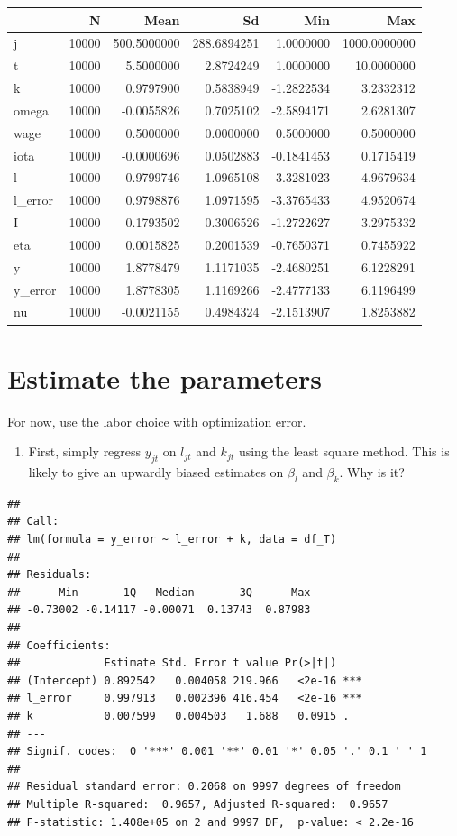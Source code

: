 \documentclass[
]{book}
\providecommand{\tightlist}{%
  \setlength{\itemsep}{0pt}\setlength{\parskip}{0pt}}
\begin{document}
\begin{tabular}{l|r|r|r|r|r}
\hline
  & N & Mean & Sd & Min & Max\\
\hline
j & 10000 & 500.5000000 & 288.6894251 & 1.0000000 & 1000.0000000\\
\hline
t & 10000 & 5.5000000 & 2.8724249 & 1.0000000 & 10.0000000\\
\hline
k & 10000 & 0.9797900 & 0.5838949 & -1.2822534 & 3.2332312\\
\hline
omega & 10000 & -0.0055826 & 0.7025102 & -2.5894171 & 2.6281307\\
\hline
wage & 10000 & 0.5000000 & 0.0000000 & 0.5000000 & 0.5000000\\
\hline
iota & 10000 & -0.0000696 & 0.0502883 & -0.1841453 & 0.1715419\\
\hline
l & 10000 & 0.9799746 & 1.0965108 & -3.3281023 & 4.9679634\\
\hline
l\_error & 10000 & 0.9798876 & 1.0971595 & -3.3765433 & 4.9520674\\
\hline
I & 10000 & 0.1793502 & 0.3006526 & -1.2722627 & 3.2975332\\
\hline
eta & 10000 & 0.0015825 & 0.2001539 & -0.7650371 & 0.7455922\\
\hline
y & 10000 & 1.8778479 & 1.1171035 & -2.4680251 & 6.1228291\\
\hline
y\_error & 10000 & 1.8778305 & 1.1169266 & -2.4777133 & 6.1196499\\
\hline
nu & 10000 & -0.0021155 & 0.4984324 & -2.1513907 & 1.8253882\\
\hline
\end{tabular}

\hypertarget{estimate-the-parameters}{%
\section{Estimate the parameters}\label{estimate-the-parameters}}

For now, use the labor choice with optimization error.

\begin{enumerate}
\def\labelenumi{\arabic{enumi}.}
\tightlist
\item
  First, simply regress \(y_{jt}\) on \(l_{jt}\) and \(k_{jt}\) using the least square method. This is likely to give an upwardly biased estimates on \(\beta_l\) and \(\beta_k\). Why is it?
\end{enumerate}

\begin{verbatim}
## 
## Call:
## lm(formula = y_error ~ l_error + k, data = df_T)
## 
## Residuals:
##      Min       1Q   Median       3Q      Max 
## -0.73002 -0.14117 -0.00071  0.13743  0.87983 
## 
## Coefficients:
##             Estimate Std. Error t value Pr(>|t|)    
## (Intercept) 0.892542   0.004058 219.966   <2e-16 ***
## l_error     0.997913   0.002396 416.454   <2e-16 ***
## k           0.007599   0.004503   1.688   0.0915 .  
## ---
## Signif. codes:  0 '***' 0.001 '**' 0.01 '*' 0.05 '.' 0.1 ' ' 1
## 
## Residual standard error: 0.2068 on 9997 degrees of freedom
## Multiple R-squared:  0.9657, Adjusted R-squared:  0.9657 
## F-statistic: 1.408e+05 on 2 and 9997 DF,  p-value: < 2.2e-16
\end{verbatim}
\end{document}
